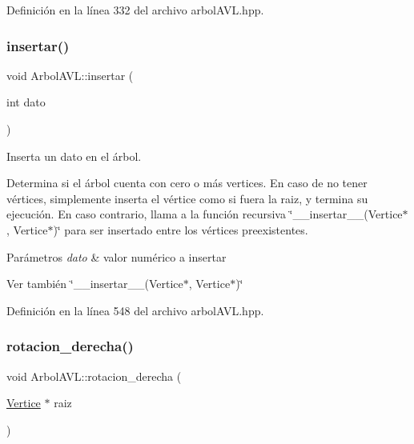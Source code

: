 Definición en la línea 332 del archivo arbol\+A\+V\+L.\+hpp.

\mbox{\label{classArbolAVL_a99512878bc14c77bf31ab7bf8dd6aa36}} 
\subsubsection{\texorpdfstring{insertar()}{insertar()}}
{\footnotesize\ttfamily void Arbol\+A\+V\+L\+::insertar (\begin{DoxyParamCaption}\item[{int}]{dato }\end{DoxyParamCaption})}



Inserta un dato en el árbol. 

Determina si el árbol cuenta con cero o más vertices. En caso de no tener vértices, simplemente inserta el vértice como si fuera la raiz, y termina su ejecución. En caso contrario, llama a la función recursiva \char`\"{}\+\_\+\+\_\+insertar\+\_\+\+\_\+(\+Vertice$\ast$, Vertice$\ast$)\char`\"{} para ser insertado entre los vértices preexistentes. 
\begin{DoxyParams}{Parámetros}
{\em dato} & valor numérico a insertar \\
\hline
\end{DoxyParams}
\begin{DoxySeeAlso}{Ver también}
\char`\"{}\+\_\+\+\_\+insertar\+\_\+\+\_\+(\+Vertice$\ast$, Vertice$\ast$)\char`\"{} 
\end{DoxySeeAlso}


Definición en la línea 548 del archivo arbol\+A\+V\+L.\+hpp.

\mbox{\label{classArbolAVL_a498e8df16b6814ea1dad6bcdf274dc3f}} 
\subsubsection{\texorpdfstring{rotacion\+\_\+derecha()}{rotacion\_derecha()}\hspace{0.1cm}{\footnotesize\ttfamily [1/2]}}
{\footnotesize\ttfamily void Arbol\+A\+V\+L\+::rotacion\+\_\+derecha (\begin{DoxyParamCaption}\item[{\hyperlink{classVertice}{Vertice} $\ast$}]{raiz }\end{DoxyParamCaption})}



